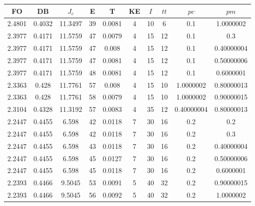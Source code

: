 \begin{table}[h!]
    \footnotesize
    \begin{center}
        \begin{tabular}{|c|c|c|c|c|c|c|c|c|c|}
        \hline
            {\bf FO} & {\bf DB} & $J_e$ & {\bf E} & {\bf T} & {\bf KE} & $I$ & $tt$ & $pc$ & $pm$ \\
        \hline
        \hline
            2.4801 & 0.4032  & 11.3497 & 39 & 0.0081 & 4 & 10 & 6 & 0.1 & 1.0000002\\
        \hline
        \hline
            2.3977 & 0.4171  & 11.5759 & 47 & 0.0079 & 4 & 15 & 12 & 0.1 & 0.3\\
        \hline
        \hline
            2.3977 & 0.4171  & 11.5759 & 47 & 0.008 & 4 & 15 & 12 & 0.1 & 0.40000004\\
        \hline
        \hline
            2.3977 & 0.4171  & 11.5759 & 47 & 0.0081 & 4 & 15 & 12 & 0.1 & 0.50000006\\
        \hline
        \hline
            2.3977 & 0.4171  & 11.5759 & 48 & 0.0081 & 4 & 15 & 12 & 0.1 & 0.6000001\\
        \hline
        \hline
            2.3363 & 0.428  & 11.7761 & 57 & 0.008 & 4 & 15 & 10 & 1.0000002 & 0.80000013\\
        \hline
        \hline
            2.3363 & 0.428  & 11.7761 & 58 & 0.0079 & 4 & 15 & 10 & 1.0000002 & 0.90000015\\
        \hline
        \hline
            2.3104 & 0.4328  & 11.3192 & 57 & 0.0083 & 4 & 35 & 12 & 0.40000004 & 0.80000013\\
        \hline
        \hline
            2.2447 & 0.4455  & 6.598 & 42 & 0.0118 & 7 & 30 & 16 & 0.2 & 0.2\\
        \hline
        \hline
            2.2447 & 0.4455  & 6.598 & 42 & 0.0118 & 7 & 30 & 16 & 0.2 & 0.3\\
        \hline
        \hline
            2.2447 & 0.4455  & 6.598 & 43 & 0.0118 & 7 & 30 & 16 & 0.2 & 0.40000004\\
        \hline
        \hline
            2.2447 & 0.4455  & 6.598 & 45 & 0.0127 & 7 & 30 & 16 & 0.2 & 0.50000006\\
        \hline
        \hline
            2.2447 & 0.4455  & 6.598 & 45 & 0.0118 & 7 & 30 & 16 & 0.2 & 0.6000001\\
        \hline
        \hline
            2.2393 & 0.4466  & 9.5045 & 53 & 0.0091 & 5 & 40 & 32 & 0.2 & 0.90000015\\
        \hline
        \hline
            2.2393 & 0.4466  & 9.5045 & 56 & 0.0092 & 5 & 40 & 32 & 0.2 & 1.0000002\\

\end{tabular}
\end{center}
\end{table}
